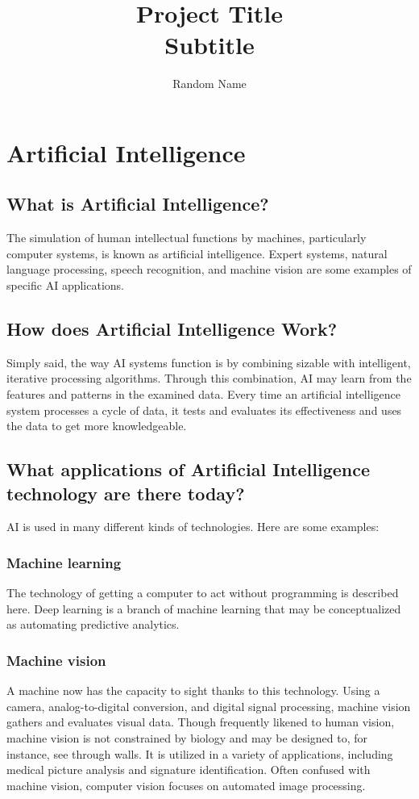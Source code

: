 \documentclass{article}
\title{%
  Project Title \\
  \large Subtitle}
\author{Random Name}
\begin{document}

\sffamily

\fancyhf{}
\fancyfoot[R]{ \bf\thepage\ \rm }%
\newpage
\tableofcontents
\pagebreak
\section{Artificial Intelligence}
\subsection{What is Artificial Intelligence?}
\large{The simulation of human intellectual functions by machines, particularly computer systems, is known as artificial intelligence. Expert systems, natural language processing, speech recognition, and machine vision are some examples of specific AI applications.}
\subsection{How does Artificial Intelligence Work?}
\large{Simply said, the way AI systems function is by combining sizable with intelligent, iterative processing algorithms. Through this combination, AI may learn from the features and patterns in the examined data. Every time an artificial intelligence system processes a cycle of data, it tests and evaluates its effectiveness and uses the data to get more knowledgeable.}
\subsection{What applications of Artificial Intelligence technology are there today?}
AI is used in many different kinds of technologies. Here are some examples:
\subsubsection{Machine learning}
The technology of getting a computer to act without programming is described here. Deep learning is a branch of machine learning that may be conceptualized as automating predictive analytics.
\subsubsection{Machine vision}
A machine now has the capacity to sight thanks to this technology. Using a camera, analog-to-digital conversion, and digital signal processing, machine vision gathers and evaluates visual data. Though frequently likened to human vision, machine vision is not constrained by biology and may be designed to, for instance, see through walls. It is utilized in a variety of applications, including medical picture analysis and signature identification. Often confused with machine vision, computer vision focuses on automated image processing.
\end{document}
